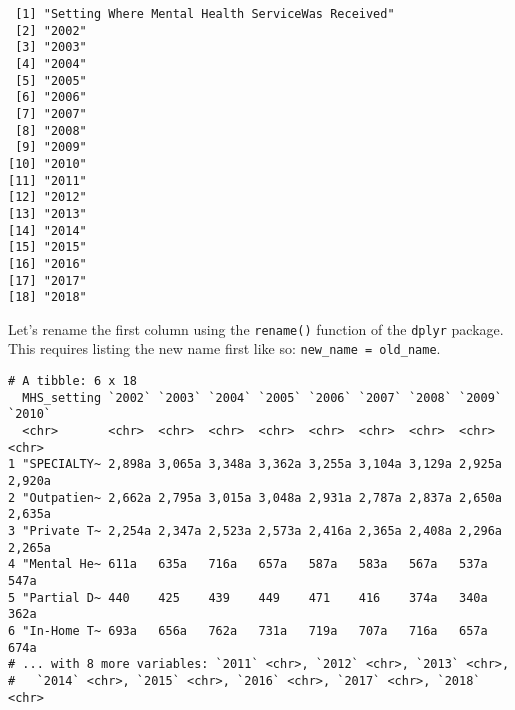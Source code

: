 \documentclass[
]{article}
\newenvironment{Shaded}{\begin{snugshade}}{\end{snugshade}}
\newcommand{\DataTypeTok}[1]{\textcolor[rgb]{0.13,0.29,0.53}{#1}}
\newcommand{\FloatTok}[1]{\textcolor[rgb]{0.00,0.00,0.81}{#1}}
\newcommand{\KeywordTok}[1]{\textcolor[rgb]{0.13,0.29,0.53}{\textbf{#1}}}
\newcommand{\NormalTok}[1]{#1}
\newcommand{\OperatorTok}[1]{\textcolor[rgb]{0.81,0.36,0.00}{\textbf{#1}}}
\newcommand{\StringTok}[1]{\textcolor[rgb]{0.31,0.60,0.02}{#1}}
\begin{document}
\begin{verbatim}
 [1] "Setting Where Mental Health ServiceWas Received"
 [2] "2002"                                           
 [3] "2003"                                           
 [4] "2004"                                           
 [5] "2005"                                           
 [6] "2006"                                           
 [7] "2007"                                           
 [8] "2008"                                           
 [9] "2009"                                           
[10] "2010"                                           
[11] "2011"                                           
[12] "2012"                                           
[13] "2013"                                           
[14] "2014"                                           
[15] "2015"                                           
[16] "2016"                                           
[17] "2017"                                           
[18] "2018"                                           
\end{verbatim}

Let's rename the first column using the \texttt{rename()} function of
the \texttt{dplyr} package. This requires listing the new name first
like so: \texttt{new\_name\ =\ old\_name}.

\begin{Shaded}
\end{Shaded}

\begin{verbatim}
# A tibble: 6 x 18
  MHS_setting `2002` `2003` `2004` `2005` `2006` `2007` `2008` `2009` `2010`
  <chr>       <chr>  <chr>  <chr>  <chr>  <chr>  <chr>  <chr>  <chr>  <chr> 
1 "SPECIALTY~ 2,898a 3,065a 3,348a 3,362a 3,255a 3,104a 3,129a 2,925a 2,920a
2 "Outpatien~ 2,662a 2,795a 3,015a 3,048a 2,931a 2,787a 2,837a 2,650a 2,635a
3 "Private T~ 2,254a 2,347a 2,523a 2,573a 2,416a 2,365a 2,408a 2,296a 2,265a
4 "Mental He~ 611a   635a   716a   657a   587a   583a   567a   537a   547a  
5 "Partial D~ 440    425    439    449    471    416    374a   340a   362a  
6 "In-Home T~ 693a   656a   762a   731a   719a   707a   716a   657a   674a  
# ... with 8 more variables: `2011` <chr>, `2012` <chr>, `2013` <chr>,
#   `2014` <chr>, `2015` <chr>, `2016` <chr>, `2017` <chr>, `2018` <chr>
\end{verbatim}
\end{document}
